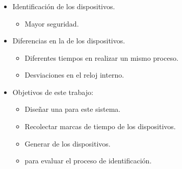 \begin{frame}
\frametitle{\secname} %
\framesubtitle{} %
\rmfamily %
\color{black} %
\begin{itemize}
    \item Identificación  de los dispositivos.
        \begin{itemize}
            \item Mayor seguridad.
        \end{itemize}
    \item Diferencias en la  de los dispositivos.
        \begin{itemize}
            \item Diferentes tiempos en realizar un mismo proceso.
            \item Desviaciones en el reloj interno.
        \end{itemize}
    \item Objetivos de este trabajo:
    \begin{itemize}
        \item Diseñar una  para este sistema. 
        \item Recolectar marcas de tiempo de los dispositivos.
        \item Generar  de los dispositivos.
        \item {} para evaluar el proceso de identificación.
    \end{itemize}
\end{itemize}
\end{frame}